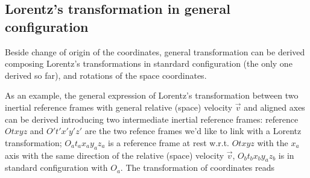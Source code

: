 \documentclass[letterpaper,10pt,english]{jupyterBook}
\begin{document}
\subsection{Lorentz’s transformation in general configuration}
\label{\detokenize{ch/relativity-special/lorentz:lorentz-s-transformation-in-general-configuration}}\label{\detokenize{ch/relativity-special/lorentz:relativity-special-lorentz-transformation-general}}
\sphinxAtStartPar
Beside change of origin of the coordinates, general transformation can be derived composing Lorentz’s transformations in stanrdard configuration (the only one derived so far), and rotations of the space coordinates.

\sphinxAtStartPar
As an example, the general expression of Lorentz’s transformation between two inertial reference frames with general relative (space) velocity \(\vec{v}\) \sphinxhyphen{} and aligned axes \sphinxhyphen{} can be derived introducing two intermediate inertial reference frames: reference \(Otxyz\) and \(O't'x'y'z'\) are the two refence frames we’d like to link with a Lorentz transformation; \(O_a t_a x_a y_a z_a\) is a reference frame at rest w.r.t. \(Otxyz\) with the \(x_a\) axis with the same direction of the relative (space) velocity \(\vec{v}\), \(O_b t_b x_b y_a z_b\) is in standard configuration with \(O_a\). The transformation of coordinates reads
\end{document}
